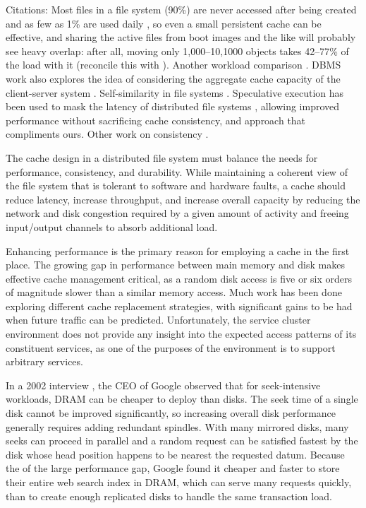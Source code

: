 Citations: Most files in a file system (90\%) are never accessed after being created and as few as 1\% are used daily \cite{gibson98b}, so even a small persistent cache can be effective, and sharing the active files from boot images and the like will probably see heavy overlap: after all, moving only 1,000--10,1000 objects takes 42--77\% of the load with it \cite{klosterman} (reconcile this with \cite{muntz}). Another workload comparison \cite{roselli}. DBMS work also explores the idea of considering the aggregate cache capacity of the client-server system \cite{franklin}. Self-similarity in file systems \cite{gribble}. Speculative execution has been used to mask the latency of distributed file systems \cite{nightengale}, allowing improved performance without sacrificing cache consistency, and approach that compliments ours. Other work on consistency \cite{triantafillou,vilayannur}.

The cache design in a distributed file system must balance the needs for performance, consistency, and durability. While maintaining a coherent view of the file system that is tolerant to software and hardware faults, a cache should reduce latency, increase throughput, and increase overall capacity by reducing the network and disk congestion required by a given amount of activity and freeing input/output channels to absorb additional load.

Enhancing performance is the primary reason for employing a cache in the first place. The growing gap in performance between main memory and disk makes effective cache management critical, as a random disk access is five or six orders of magnitude slower than a similar memory access. Much work has been done exploring different cache replacement strategies, with significant gains to be had when future traffic can be predicted. Unfortunately, the service cluster environment does not provide any insight into the expected access patterns of its constituent services, as one of the purposes of the environment is to support arbitrary services.

In a 2002 interview \cite{spring}, the CEO of Google observed that for seek-intensive workloads, DRAM can be cheaper to deploy than disks. The seek time of a single disk cannot be improved significantly, so increasing overall disk performance generally requires adding redundant spindles. With many mirrored disks, many seeks can proceed in parallel and a random request can be satisfied fastest by the disk whose head position happens to be nearest the requested datum. Because the of the large performance gap, Google found it cheaper and faster to store their entire web search index in DRAM, which can serve many requests quickly, than to create enough replicated disks to handle the same transaction load.

